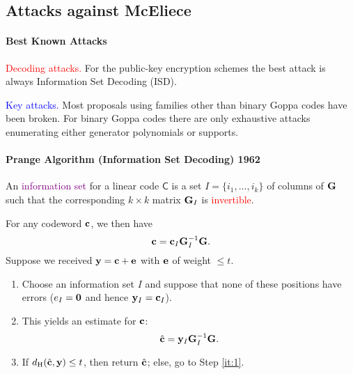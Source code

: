 \documentclass[a4paper, 11pt, openany]{book}
\numberwithin{equation}{section}
\theoremstyle{plain}
\theoremstyle{definition}
\newcommand{\dH}{d_\mathrm{H}}
\newcommand{\Important}[1]{\textcolor{red}{#1}}
\newcommand{\Structure}[1]{\textcolor{blue}{#1}}
\newcommand{\Define}[1]{\textcolor{purple}{#1}}
\newcommand{\code}[1]{\mathsf{#1}}
\begin{document}
\subsection{Attacks against McEliece}


%
%
%
%
%
%
%
%



\paragraph{Best Known Attacks}
\Important{Decoding attacks.} For the public-key encryption schemes the best
attack is always Information Set Decoding (ISD).

\Structure{Key attacks.} Most proposals using families other than binary Goppa codes have been broken. For binary Goppa codes there are only exhaustive attacks enumerating either generator polynomials or supports.




\paragraph{Prange Algorithm (Information Set Decoding) 1962}

An \Define{information set} for a linear code $\code{C}$ is a set $I =\{ i_1, \dots, i_k \}$ of columns of ${\bf G}$ such that the corresponding $k \times k$ matrix ${\bf G}_I$ is \Important{invertible}.

For any codeword ${\bf c}$, we then have 
\[
    {\bf c} = {\bf c}_I {\bf G}_I^{-1} {\bf G}.
\]
Suppose we received ${\bf y} = {\bf c} + {\bf e}$ with ${\bf e}$ of weight $\le t$.
\begin{enumerate}
	\item \label{it:1} Choose an information set $I$ and suppose that none of these positions have errors ($e_I = {\bf 0}$ and hence ${\bf y}_I = {\bf c}_I$).

	\item This yields an estimate for ${\bf c}$: 
	\[
		\hat{\bf c} = {\bf y}_I {\bf G}_I^{-1} {\bf G}.
	\]
	
	\item If $\dH(\hat{\bf c}, {\bf y}) \le t$, then return $\hat{\bf c}$; 	else, go to Step \ref{it:1}.
\end{enumerate}
\end{document}
